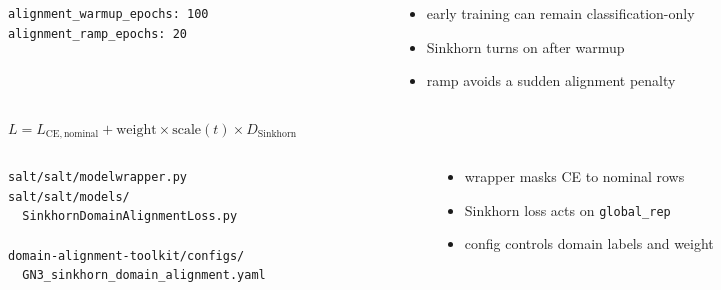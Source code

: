 \begin{frame}

  \vspace{14mm}
  \begin{columns}[T,totalwidth=\textwidth]
    \begin{column}{0.42\textwidth}
      \begin{lstlisting}[style=yamlcode]
alignment_warmup_epochs: 100
alignment_ramp_epochs: 20
      \end{lstlisting}
    \end{column}
    \begin{column}{0.54\textwidth}
      \begin{itemize}\tightlist
        \item early training can remain classification-only
        \item Sinkhorn turns on after warmup
        \item ramp avoids a sudden alignment penalty
      \end{itemize}
    \end{column}
  \end{columns}

  \vspace{2mm}
  \begin{center}
    {\small $L = L_{\mathrm{CE, nominal}} + \mathrm{weight}\times\mathrm{scale}(t)\times D_{\mathrm{Sinkhorn}}$}
  \end{center}

  \slideheaderfooter
\end{frame}

\begin{frame}

  \vspace{14mm}
  \begin{columns}[T,totalwidth=\textwidth]
    \begin{column}{0.48\textwidth}
      \begin{lstlisting}[style=textcode]
salt/salt/modelwrapper.py
salt/salt/models/
  SinkhornDomainAlignmentLoss.py

domain-alignment-toolkit/configs/
  GN3_sinkhorn_domain_alignment.yaml
      \end{lstlisting}
    \end{column}
    \begin{column}{0.48\textwidth}
      \begin{itemize}\tightlist
        \item wrapper masks CE to nominal rows
        \item Sinkhorn loss acts on \texttt{global\_rep}
        \item config controls domain labels and weight
      \end{itemize}
    \end{column}
  \end{columns}

  \slideheaderfooter
\end{frame}

